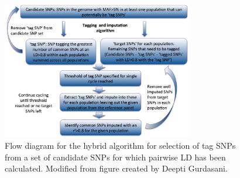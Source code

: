 \begin{figure}
\centering
\includegraphics[trim={0 0 0 0},clip,width=0.75\textwidth]{fig/tagSNPselection}
\caption[Flow diagram for the hybrid algorithm for selection of tag \glspl{SNP} from a set of candidate \glspl{SNP}]{Flow diagram for the hybrid algorithm for selection of tag \glspl{SNP} from a set of candidate \glspl{SNP} for which pairwise \gls{LD} has been calculated. Modified from figure created by Deepti Gurdasani.}
\label{fig:SN13f1}
\end{figure}